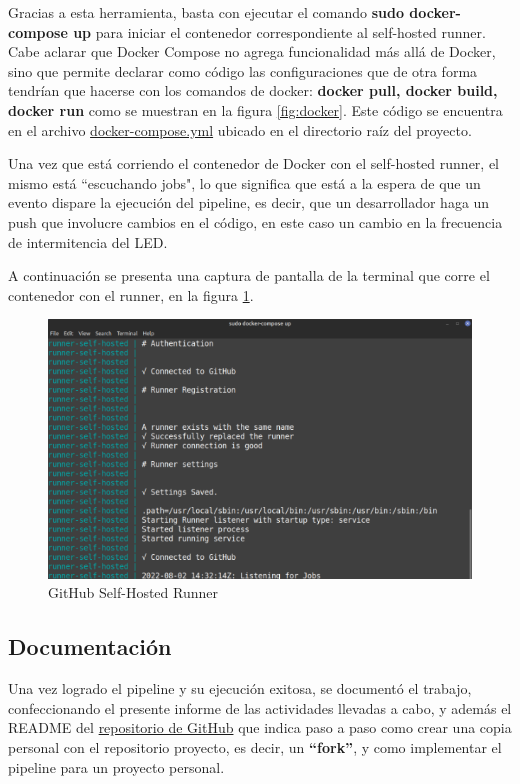 Gracias a esta herramienta, basta con ejecutar el comando \textbf{sudo docker-compose up} para iniciar el contenedor correspondiente al self-hosted runner. Cabe aclarar que Docker Compose no agrega funcionalidad más allá de Docker, sino que permite declarar como código las configuraciones que de otra forma tendrían que hacerse con los comandos de docker: \textbf{docker pull, docker build, docker run} como se muestran en la figura \ref{fig:docker}. Este código se encuentra en el archivo \href{https://github.com/FeedehC/pipeline-esp32/blob/main/docker-compose.yml}{docker-compose.yml} ubicado en el directorio raíz del proyecto.

Una vez que está corriendo el contenedor de Docker con el self-hosted runner, el mismo está ``escuchando jobs", lo que significa que está a la espera de que un evento dispare la ejecución del pipeline, es decir, que un desarrollador haga un push que involucre cambios en el código, en este caso un cambio en la frecuencia de intermitencia del LED.

A continuación se presenta una captura de pantalla de la terminal que corre el contenedor con el runner, en la figura \ref{fig:runner}.

\begin{figure}[H]
    \centering
    \includegraphics[width=1\textwidth]{fig/runner_log.png}
    \caption{GitHub Self-Hosted Runner}
    \label{fig:runner}
\end{figure}


\subsection{Documentación}
Una vez logrado el pipeline y su ejecución exitosa, se documentó el trabajo, confeccionando el presente informe de las actividades llevadas a cabo, y además el README del \href{https://github.com/FeedehC/pipeline-esp32}{repositorio de GitHub} que indica paso a paso como crear una copia personal con el repositorio proyecto, es decir, un \textbf{``fork''}, y como implementar el pipeline para un proyecto personal. 

